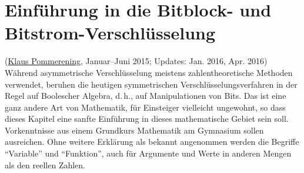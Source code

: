 
\begin{refsegment}







\setcounter{satz}{0}
\setcounter{definition}{0}


\newpage %
\hypertarget{Chapter_BitCiphers}{}   %
\chapter{Einführung in die Bitblock- und Bitstrom-Verschlüsselung}
\label{Chapter_BitCiphers}
(\hyperlink{author_Klaus-Pommerening}{Klaus Pommerening},
 Januar--Juni 2015; Updates: Jan. 2016, Apr. 2016) \\

Während asymmetrische Verschlüsselung meistens zahlentheoretische Methoden
verwendet, beruhen die heutigen symmetrischen
Verschlüsselungsverfahren
in der Regel auf Boolescher Algebra,
d.\,h., auf Manipulationen von Bits.
Das ist eine ganz andere Art von Mathematik, für Einsteiger vielleicht
ungewohnt, so dass dieses Kapitel eine sanfte Einführung in dieses mathematische
Gebiet sein soll. Vorkenntnisse aus einem Grundkurs Mathematik am Gymnasium
sollen ausreichen. Ohne weitere Erklärung als bekannt
angenommen werden die Begriffe "`Variable"' und "`Funktion"', auch für Argumente
und Werte in anderen Mengen als den reellen Zahlen.


\end{refsegment}
